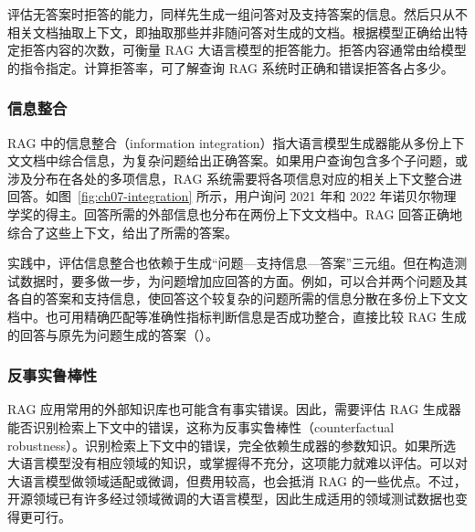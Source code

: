 
\begin{practicaltip}
评估无答案时拒答的能力，同样先生成一组问答对及支持答案的信息。然后只从不相关文档抽取上下文，即抽取那些并非随问答对生成的文档。根据模型正确给出特定拒答内容的次数，可衡量 RAG 大语言模型的拒答能力。拒答内容通常由给模型的指令指定。计算拒答率，可了解查询 RAG 系统时正确和错误拒答各占多少。
\end{practicaltip}

\subsubsection{信息整合}
RAG 中的信息整合（information integration）指大语言模型生成器能从多份上下文文档中综合信息，为复杂问题给出正确答案。如果用户查询包含多个子问题，或涉及分布在各处的多项信息，RAG 系统需要将各项信息对应的相关上下文整合进回答。如图~\ref{fig:ch07-integration} 所示，用户询问 2021 年和 2022 年诺贝尔物理学奖的得主。回答所需的外部信息也分布在两份上下文文档中。RAG 回答正确地综合了这些上下文，给出了所需的答案。


\begin{practicaltip}
实践中，评估信息整合也依赖于生成“问题—支持信息—答案”三元组。但在构造测试数据时，要多做一步，为问题增加应回答的方面。例如，可以合并两个问题及其各自的答案和支持信息，使回答这个较复杂的问题所需的信息分散在多份上下文文档中。也可用精确匹配等准确性指标判断信息是否成功整合，直接比较 RAG 生成的回答与原先为问题生成的答案（）。
\end{practicaltip}

\subsubsection{反事实鲁棒性}
RAG 应用常用的外部知识库也可能含有事实错误。因此，需要评估 RAG 生成器能否识别检索上下文中的错误，这称为反事实鲁棒性（counterfactual robustness）。识别检索上下文中的错误，完全依赖生成器的参数知识。如果所选大语言模型没有相应领域的知识，或掌握得不充分，这项能力就难以评估。可以对大语言模型做领域适配或微调，但费用较高，也会抵消 RAG 的一些优点。不过，开源领域已有许多经过领域微调的大语言模型，因此生成适用的领域测试数据也变得更可行。

